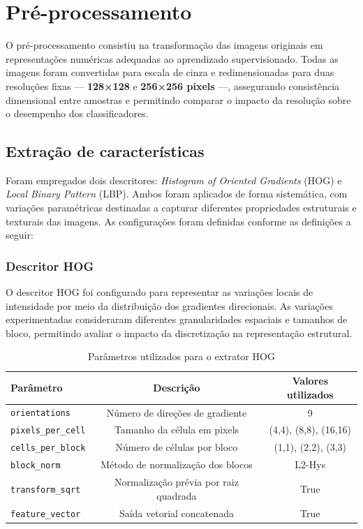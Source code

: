\documentclass[12pt]{article}
\begin{document}
\section{Pré-processamento}

O pré-processamento consistiu na transformação das imagens originais em representações numéricas adequadas ao aprendizado supervisionado. Todas as imagens foram convertidas para escala de cinza e redimensionadas para duas resoluções fixas — \textbf{128×128} e \textbf{256×256 pixels} —, assegurando consistência dimensional entre amostras e permitindo comparar o impacto da resolução sobre o desempenho dos classificadores.  

\subsection{Extração de características}

Foram empregados dois descritores: \textit{Histogram of Oriented Gradients} (HOG) e \textit{Local Binary Pattern} (LBP). Ambos foram aplicados de forma sistemática, com variações paramétricas destinadas a capturar diferentes propriedades estruturais e texturais das imagens. As configurações foram definidas conforme as definições a seguir:

\subsubsection{Descritor HOG}

O descritor HOG foi configurado para representar as variações locais de intensidade por meio da distribuição dos gradientes direcionais. As variações experimentadas consideraram diferentes granularidades espaciais e tamanhos de bloco, permitindo avaliar o impacto da discretização na representação estrutural.

\begin{table}[H]
\centering
\caption{Parâmetros utilizados para o extrator HOG}
\label{tab:hog_parametros}
\begin{tabular}{lcc}
\toprule
\textbf{Parâmetro} & \textbf{Descrição} & \textbf{Valores utilizados} \\
\midrule
\texttt{orientations} & Número de direções de gradiente & 9 \\
\texttt{pixels\_per\_cell} & Tamanho da célula em pixels & (4,4), (8,8), (16,16) \\
\texttt{cells\_per\_block} & Número de células por bloco & (1,1), (2,2), (3,3) \\
\texttt{block\_norm} & Método de normalização dos blocos & L2-Hys \\
\texttt{transform\_sqrt} & Normalização prévia por raiz quadrada & True \\
\texttt{feature\_vector} & Saída vetorial concatenada & True \\
\bottomrule
\end{tabular}
\end{table}
\end{document}
